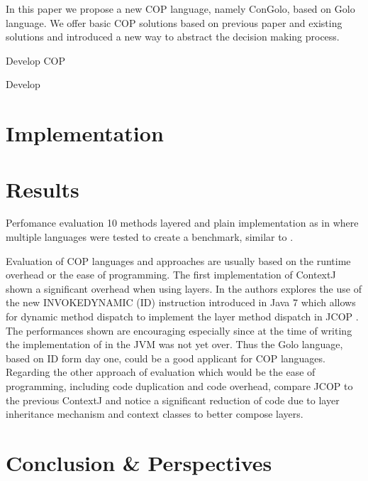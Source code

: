 \documentclass[a4paper]{article}
\begin{document}
In this paper we propose a new COP language, namely ConGolo, based on Golo language. We offer basic COP solutions based on previous paper and existing solutions and introduced a new way to abstract the decision making process.

Develop COP

Develop 


\section{Implementation}
\label{section:implementation}

\section{Results}
\label{section:results}

Perfomance evaluation
10 methods layered and plain implementation as in \cite{appeltauer_comparison_2009} where multiple languages were tested to create a benchmark, similar to \cite{kamina_eventcj:_2011}.

Evaluation of COP languages and approaches are usually based on the runtime overhead or the ease of programming. The first implementation of ContextJ \cite{haupt_contextj:_2011} shown a significant overhead when using layers. In \cite{appeltauer_layered_2010} the authors explores the use of the new INVOKEDYNAMIC (ID) instruction introduced in Java 7 which allows for dynamic method dispatch to implement the layer method dispatch in JCOP \cite{appeltauer_declarative_2013}. The performances shown are encouraging especially since at the time of writing the implementation of in the JVM was not yet over. Thus the Golo language, based on ID form day one, could be a good applicant for COP languages. Regarding the other approach of evaluation which would be the ease of programming, including code duplication and code overhead, \cite{appeltauer_declarative_2013} compare JCOP to the previous ContextJ and notice a significant reduction of code due to layer inheritance mechanism and context classes to better compose layers.

\section{Conclusion \& Perspectives}
\label{section:conclusion}


%
%



\end{document}
